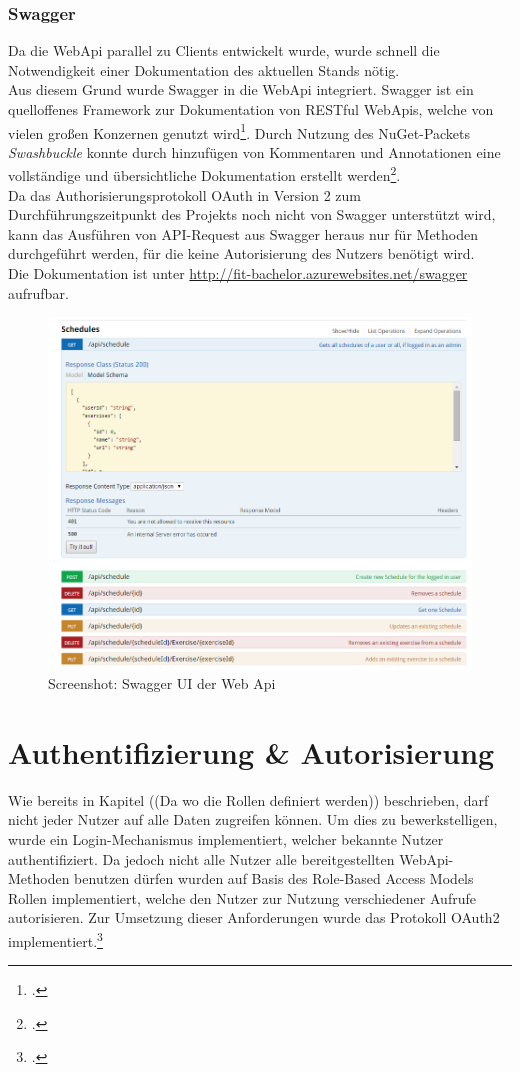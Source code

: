 \subsubsection*{Swagger}
\label{sssec:Swagger}
Da die WebApi parallel zu Clients entwickelt wurde, wurde schnell die Notwendigkeit einer Dokumentation des aktuellen Stands nötig. \\
Aus diesem Grund wurde Swagger in die WebApi integriert. Swagger ist ein quelloffenes Framework zur Dokumentation von RESTful WebApis, welche von vielen großen Konzernen genutzt wird\footcite{swagger}. Durch Nutzung des \ac{NuGet}-Packets \textit{Swashbuckle} konnte durch hinzufügen von Kommentaren und Annotationen eine vollständige und übersichtliche Dokumentation erstellt werden\footcite{implementing-Swagger}. \\
Da das Authorisierungsprotokoll \ac{OAuth} in Version 2 zum Durchführungszeitpunkt des Projekts noch nicht von Swagger unterstützt wird, kann das Ausführen von API-Request aus Swagger heraus nur für Methoden durchgeführt werden, für die keine Autorisierung des Nutzers benötigt wird. \\
Die Dokumentation ist unter \href{http://fit-bachelor.azurewebsites.net/swagger}{http://fit-bachelor.azurewebsites.net/swagger} aufrufbar. 
\begin{figure}[h]
\centering
\includegraphics[width=0.8\linewidth]{content/images/Swagger-UI-fIT}
\caption{Screenshot: Swagger UI der Web Api}
\label{pic:swagger-UI}
\end{figure}
\section{Authentifizierung \& Autorisierung}
\label{sec:server-authorisierung}
Wie bereits in Kapitel ((Da wo die Rollen definiert werden)) beschrieben, darf nicht jeder Nutzer auf alle Daten zugreifen können. Um dies zu bewerkstelligen, wurde ein Login-Mechanismus implementiert, welcher bekannte Nutzer authentifiziert. Da jedoch nicht alle Nutzer alle bereitgestellten WebApi-Methoden benutzen dürfen wurden auf Basis des \ac{Role-Based Access Models} Rollen implementiert, welche den Nutzer zur Nutzung verschiedener Aufrufe autorisieren. Zur Umsetzung dieser Anforderungen wurde das Protokoll OAuth2 implementiert.\footcite{online:WebApi_Authorize}
